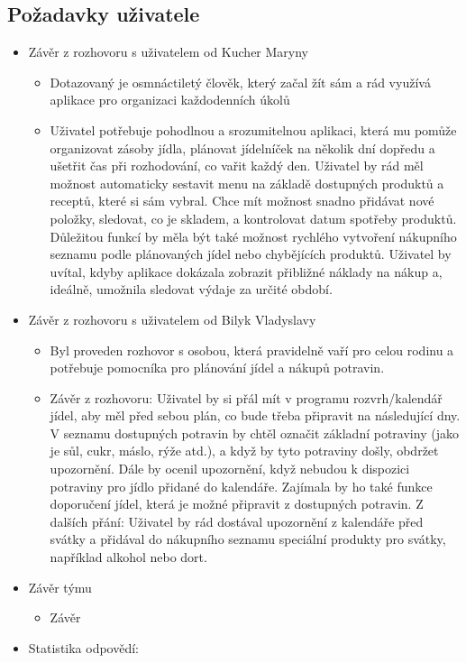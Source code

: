 \documentclass[a4paper,12pt]{article}
\begin{document}
\subsection*{Požadavky uživatele}
\begin{itemize}
    \item Závěr z rozhovoru s uživatelem od Kucher Maryny
    \begin{itemize}
        \item Dotazovaný je osmnáctiletý člověk, který začal žít sám a rád využívá aplikace pro organizaci každodenních úkolů
        \item Uživatel potřebuje pohodlnou a srozumitelnou aplikaci, která mu pomůže organizovat zásoby jídla, plánovat jídelníček na několik dní dopředu a ušetřit čas při rozhodování, co vařit každý den.
        Uživatel by rád měl možnost automaticky sestavit menu na základě dostupných produktů a receptů, které si sám vybral. Chce mít možnost snadno přidávat nové položky, sledovat, co je skladem, a kontrolovat datum spotřeby produktů.
        Důležitou funkcí by měla být také možnost rychlého vytvoření nákupního seznamu podle plánovaných jídel nebo chybějících produktů. Uživatel by uvítal, kdyby aplikace dokázala zobrazit přibližné náklady na nákup a, ideálně, umožnila sledovat výdaje za určité období.
    \end{itemize}
    \item Závěr z rozhovoru s uživatelem od Bilyk Vladyslavy
    \begin{itemize}
        \item Byl proveden rozhovor s osobou, která pravidelně vaří pro celou rodinu a potřebuje pomocníka pro plánování jídel a nákupů potravin.
        \item Závěr z rozhovoru: Uživatel by si přál mít v programu rozvrh/kalendář jídel, aby měl před sebou plán, co bude třeba připravit na následující dny. V seznamu dostupných potravin by chtěl označit základní potraviny (jako je sůl, cukr, máslo, rýže atd.), a když by tyto potraviny došly, obdržet upozornění. Dále by ocenil upozornění, když nebudou k dispozici potraviny pro jídlo přidané do kalendáře. Zajímala by ho také funkce doporučení jídel, která je možné připravit z dostupných potravin. Z dalších přání: Uživatel by rád dostával upozornění z kalendáře před svátky a přidával do nákupního seznamu speciální produkty pro svátky, například alkohol nebo dort.
    \end{itemize}
    \item Závěr týmu
    \begin{itemize}
        \item Závěr
    \end{itemize}
    \item Statistika odpovědí:
\end{itemize}
\end{document}
